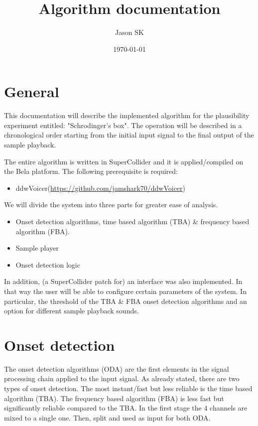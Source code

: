 \documentclass[11pt]{article}
\author{Jason SK}
\date{\today}
\title{Algorithm documentation}
\begin{document}
\maketitle
\tableofcontents


\section{General}
\label{sec:orgee0fa83}
This documentation will describe the implemented algorithm for the plausibility experiment entitled: "Schrodinger's box".  The operation will be described in a chronological order starting from the initial input signal to the final output of the sample playback.

The entire algorithm is written in SuperCollider and it is applied/compiled on the Bela platform.  The following prerequisite is required:
\begin{itemize}
\item ddwVoicer(\url{https://github.com/jamshark70/ddwVoicer})
\end{itemize}

We will divide the system into three parts for greater ease of analysis.
\begin{itemize}
\item Onset detection algorithms, time based algorithm (TBA) \& frequency based algorithm (FBA).
\item Sample player
\item Onset detection logic
\end{itemize}

In addition, (a SuperCollider patch for) an interface was also implemented.  In that way the user will be able to configure certain parameters of the system.  In particular, the threshold of the TBA \& FBA onset detection algorithms and an option for different sample playback sounds.

\section{Onset detection}
\label{sec:org1431187}

The onset detection algorithms (ODA) are the first elements in the signal processing chain applied to the input signal.  As already stated, there are two types of onset detection.  The most instant/fast but less reliable is the time based algorithm (TBA).  The frequency based algorithm (FBA) is less fast but significantly reliable compared to the TBA.  In the first stage the 4 channels are mixed to a single one.  Then, split and used as input for both ODA.
\end{document}
